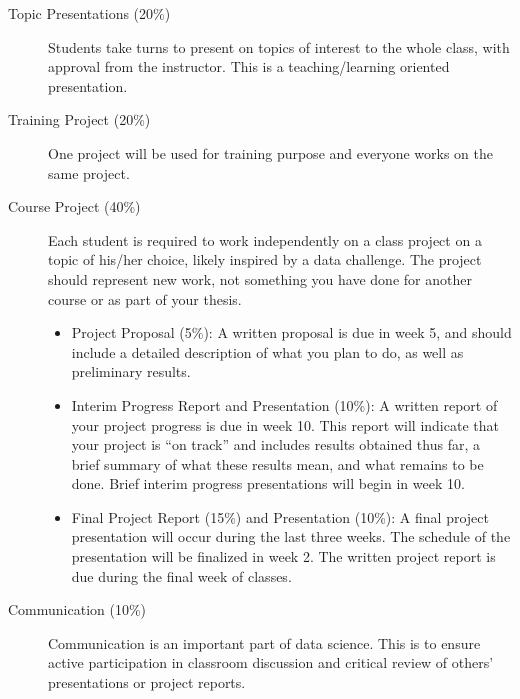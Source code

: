 \documentclass[twocolumn, 11pt]{article}
\begin{document}
\begin{description}
\begin{description}
\item[Topic Presentations (20\%)]
Students take turns to present on topics of interest to the whole
class, with approval from the instructor.
This is a teaching/learning oriented presentation.


\item[Training Project (20\%)]
One project will be used for training purpose and everyone works on
the same project.


\item[Course Project (40\%)]
Each student is required to work independently on a class
project on a topic of his/her choice, likely inspired by a data
challenge. 
The project should represent new work, not something you
have done for another course or as part of your thesis.

\begin{itemize}
\item Project Proposal (5\%): A written proposal is due in week 5,
  and should include a detailed description of what you plan to do, as
  well as preliminary results.
  

\item Interim Progress Report and Presentation (10\%):
  A written report of your project progress is due in week 10.
  This report will indicate that your project is ``on track'' 
  and includes results obtained thus far, a brief summary
  of what these results mean, and what remains to be done.
  Brief interim progress presentations will begin in week 10.

\item Final Project Report (15\%) and Presentation (10\%): 
  A final project presentation will occur during the last three weeks.
  The schedule of the presentation will be finalized in week 2. The
  written project report is due during the final week of classes.

\end{itemize}

\item[Communication (10\%)]
  Communication is an important part of data science. This is to ensure
  active participation in classroom discussion and critical review of
  others' presentations or project reports.
  

\end{description}


\end{description}
\end{document}
